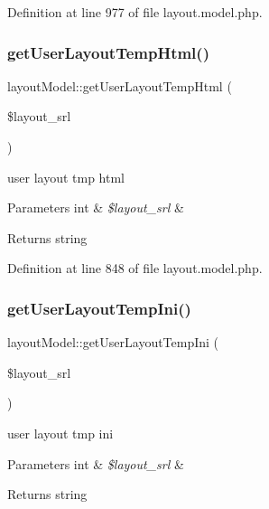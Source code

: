Definition at line 977 of file layout.\+model.\+php.

\mbox{\label{classlayoutModel_a19aaacba7d0b1c9bb466534933595381}} 
\subsubsection{\texorpdfstring{get\+User\+Layout\+Temp\+Html()}{getUserLayoutTempHtml()}}
{\footnotesize\ttfamily layout\+Model\+::get\+User\+Layout\+Temp\+Html (\begin{DoxyParamCaption}\item[{}]{\$layout\+\_\+srl }\end{DoxyParamCaption})}

user layout tmp html 
\begin{DoxyParams}[1]{Parameters}
int & {\em \$layout\+\_\+srl} & \\
\hline
\end{DoxyParams}
\begin{DoxyReturn}{Returns}
string 
\end{DoxyReturn}


Definition at line 848 of file layout.\+model.\+php.

\mbox{\label{classlayoutModel_a0de830b5db7303b6909568dfdfad2ac3}} 
\subsubsection{\texorpdfstring{get\+User\+Layout\+Temp\+Ini()}{getUserLayoutTempIni()}}
{\footnotesize\ttfamily layout\+Model\+::get\+User\+Layout\+Temp\+Ini (\begin{DoxyParamCaption}\item[{}]{\$layout\+\_\+srl }\end{DoxyParamCaption})}

user layout tmp ini 
\begin{DoxyParams}[1]{Parameters}
int & {\em \$layout\+\_\+srl} & \\
\hline
\end{DoxyParams}
\begin{DoxyReturn}{Returns}
string 
\end{DoxyReturn}


